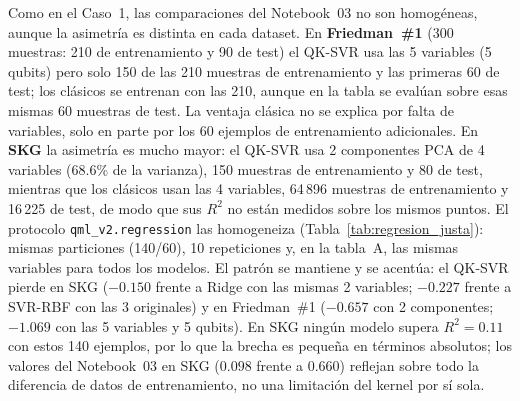 Como en el Caso~1, las comparaciones del Notebook~03 no son homogéneas, aunque la asimetría es distinta en cada dataset. En \textbf{Friedman~\#1} (300 muestras: 210 de entrenamiento y 90 de test) el QK-SVR usa las 5 variables (5 qubits) pero solo 150 de las 210 muestras de entrenamiento y las primeras 60 de test; los clásicos se entrenan con las 210, aunque en la tabla se evalúan sobre esas mismas 60 muestras de test. La ventaja clásica no se explica por falta de variables, solo en parte por los 60 ejemplos de entrenamiento adicionales. En \textbf{SKG} la asimetría es mucho mayor: el QK-SVR usa 2 componentes PCA de 4 variables (68.6\% de la varianza), 150 muestras de entrenamiento y 80 de test, mientras que los clásicos usan las 4 variables, 64\,896 muestras de entrenamiento y 16\,225 de test, de modo que sus $R^2$ no están medidos sobre los mismos puntos. El protocolo \texttt{qml\_v2.regression} las homogeneiza (Tabla~\ref{tab:regresion_justa}): mismas particiones (140/60), 10 repeticiones y, en la tabla~A, las mismas variables para todos los modelos. El patrón se mantiene y se acentúa: el QK-SVR pierde en SKG ($-0.150$ frente a Ridge con las mismas 2 variables; $-0.227$ frente a SVR-RBF con las 3 originales) y en Friedman~\#1 ($-0.657$ con 2 componentes; $-1.069$ con las 5 variables y 5 qubits). En SKG ningún modelo supera $R^2=0.11$ con estos 140 ejemplos, por lo que la brecha es pequeña en términos absolutos; los valores del Notebook~03 en SKG ($0.098$ frente a $0.660$) reflejan sobre todo la diferencia de datos de entrenamiento, no una limitación del kernel por sí sola.

\begin{table}[ht]
\centering
\footnotesize
\setlength{\tabcolsep}{4pt}
\caption{Protocolo justo de regresión (\texttt{qml\_v2.regression}); $R^2$ en test (media $\pm$ desviación sobre 10 repeticiones; 140 ejemplos de entrenamiento y 60 de test; $C=10$, $\varepsilon=0.1$ en todos los SVR). A: todos los modelos con las mismas variables que el QK-SVR. B: clásicos con todas las variables originales (3 en SKG, 5 en Friedman). RF = Random Forest. Fuente: \texttt{qml\_v2\_regression\_all.csv}.}
\label{tab:regresion_justa}
\end{table}

